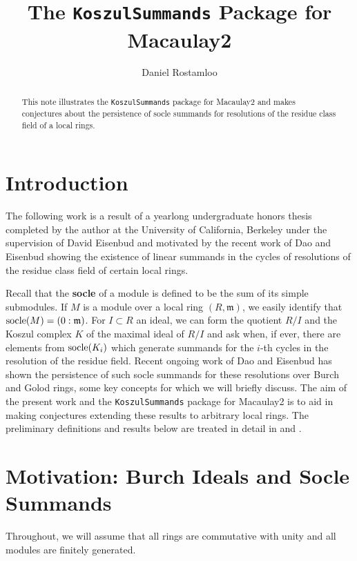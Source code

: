 \documentclass[twoside,12pt, leqno]{amsart}
\author{Daniel Rostamloo}
\title{The \texttt{KoszulSummands} Package for Macaulay2}
\begin{document}
\begin{abstract}
	This note illustrates the \texttt{KoszulSummands} package for Macaulay2 and makes conjectures about the persistence of socle summands for resolutions of the residue class field of a local rings.
\end{abstract}

\maketitle

\section*{Introduction}

The following work is a result of a yearlong undergraduate honors thesis completed by the author at the University of California, Berkeley under the supervision of David Eisenbud and motivated by the recent work \cite{DE23} of Dao and Eisenbud showing the existence of linear summands in the cycles of resolutions of the residue class field of certain local rings. 

Recall that the \textbf{socle} of a module is defined to be the sum of its simple submodules. If $M$ is a module over a local ring $(R, \mathfrak{m})$, we easily identify that $\operatorname{socle}(M) = (0 : \mathfrak{m})$. For $I \subset R$ an ideal, we can form the quotient $R / I$ and the Koszul complex $K$ of the maximal ideal of $R / I$ and ask when, if ever, there are elements from $\operatorname{socle}(K_i)$ which generate summands for the $i$-th cycles in the resolution of the residue field. Recent ongoing work of Dao and Eisenbud has shown the persistence of such socle summands for these resolutions over Burch and Golod rings, some key concepts for which we will briefly discuss. The aim of the present work and the \texttt{KoszulSummands} package for Macaulay2 is to aid in making conjectures extending these results to arbitrary local rings. The preliminary definitions and results below are treated in detail in \cite{DKT20} and \cite{DE23}. 

\section{Motivation: Burch Ideals and Socle Summands}

Throughout, we will assume that all rings are commutative with unity and all modules are finitely generated.
\end{document}
